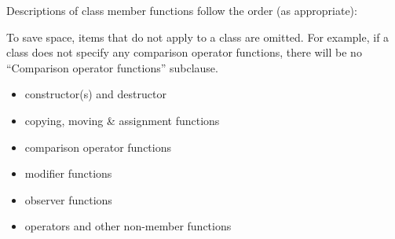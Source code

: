 \pnum
Descriptions of class member functions follow the order (as
appropriate):
\begin{footnote}
To save space, items that do not apply to a class are omitted.
For example, if a class does not specify any comparison operator functions, there
will be no ``Comparison operator functions'' subclause.
\end{footnote}
\begin{itemize}
\item constructor(s) and destructor
\item copying, moving \& assignment functions
\item comparison operator functions
\item modifier functions
\item observer functions
\item operators and other non-member functions
\end{itemize}

